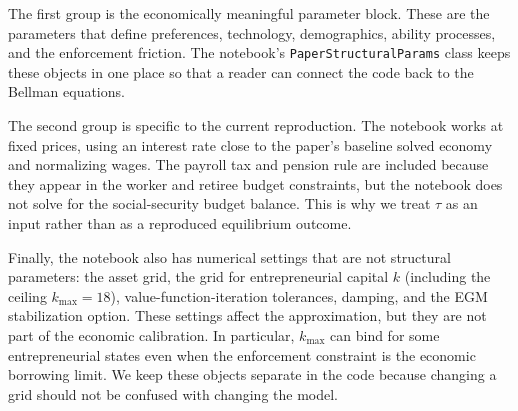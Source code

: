 \documentclass[\latexroot/\projectname]{subfiles}
\begin{document}
The first group is the economically meaningful parameter block. These are the parameters that define preferences, technology, demographics, ability processes, and the enforcement friction. The notebook's \texttt{PaperStructuralParams} class keeps these objects in one place so that a reader can connect the code back to the Bellman equations.

The second group is specific to the current reproduction. The notebook works at fixed prices, using an interest rate close to the paper's baseline solved economy and normalizing wages. The payroll tax and pension rule are included because they appear in the worker and retiree budget constraints, but the notebook does not solve for the social-security budget balance. This is why we treat $\tau$ as an input rather than as a reproduced equilibrium outcome.

Finally, the notebook also has numerical settings that are not structural parameters: the asset grid, the grid for entrepreneurial capital $k$ (including the ceiling $k_{\max}=18$), value-function-iteration tolerances, damping, and the EGM stabilization option. These settings affect the approximation, but they are not part of the economic calibration. In particular, $k_{\max}$ can bind for some entrepreneurial states even when the enforcement constraint is the economic borrowing limit. We keep these objects separate in the code because changing a grid should not be confused with changing the model.

\smartbib
\end{document}
